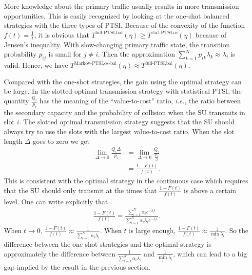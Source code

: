 \documentclass[10pt,final,journal,letterpaper]{IEEEtran}
\newcommand{\ie}{\emph{i.e.}, }
\begin{document}
More knowledge about the primary traffic usually results in more transmission opportunities. This is easily recognized by looking at the one-shot balanced strategies with the three types of PTSI. Because of the convexity of the function $f(t)=\frac{1}{t}$, it is obvious that $T^{\text{full-PTSI,bal}}(\eta)\geq T^{\text{stat-PTSI,os}}(\eta)$ because of Jensen's inequality. With slow-changing primary traffic state, the transition probability $p_{ij}$ is small for $j\neq i$. Then the approximation $\sum_{k=1}^{N}p_{ik}\lambda_k\approx\lambda_i$ is valid. Hence, we have $T^{\text{Markov-PTSI,os-bal}}(\eta)\approx T^{\text{full-PTSI,bal}}(\eta)$.

\par
Compared with the one-shot strategies, the gain using the optimal strategy can be large. In the slotted optimal transmission strategy with statistical PTSI, the quantity $\frac{Q_i}{p_i}$ has the meaning of the ``value-to-cost'' ratio, \ie the ratio between the secondary capacity and the probability of collision when the SU transmits in slot $i$. The slotted optimal transmission strategy suggests that the SU should always try to use the slots with the largest value-to-cost ratio. When the slot length $\Delta$ goes to zero we get
\begin{align}
    \lim\limits_{\Delta\rightarrow 0}\frac{Q_i\Delta}{p_i}&=\lim\limits_{\Delta\rightarrow 0}\frac{Q_i}{\frac{p_i}{\Delta}}\nonumber\\
    &=\frac{1-F(t)}{f(t)}.\nonumber
\end{align}
This is consistent with the optimal strategy in the continuous case which requires that the SU should only transmit at the times that $\frac{1-F(t)}{f(t)}$ is above a certain level. One can write explicitly that
\begin{align}
    \frac{1-F(t)}{f(t)}=\frac{\sum_{i=1}^{N}\alpha_ie^{-\lambda_it}}{\sum_{i=1}^{N}\alpha_i\lambda_ie^{-\lambda_it}}.
\end{align}
When $t\rightarrow 0$, $\frac{1-F(t)}{f(t)}\approx\frac{1}{\sum_{i=1}^{N}\alpha_i\lambda_i}$. When $t$ is large enough, $\frac{1-F(t)}{f(t)}\approx\frac{1}{\min\limits_{i}\lambda_i}$. So the difference between the one-shot strategies and the optimal strategy is approximately the difference between $\frac{1}{\sum_{i=1}^{N}\alpha_i\lambda_i}$ and $\frac{1}{\min\limits_{i}\lambda_i}$, which can lead to a big gap implied by the result in the previous section.
\end{document}
